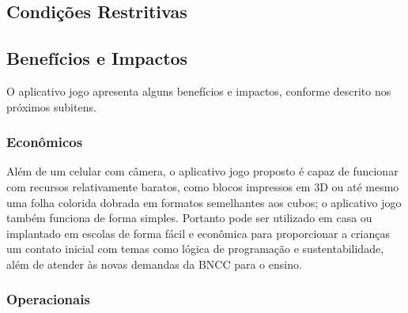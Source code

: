      \subsection{Condições Restritivas}
    
        
        
        
        
    
 \subsection{Benefícios e Impactos}
O aplicativo jogo apresenta alguns benefícios e impactos, conforme descrito nos próximos subitens.

        \subsubsection{Econômicos}
Além de um celular com câmera, o aplicativo jogo proposto é capaz de funcionar com recursos relativamente baratos, como blocos impressos em 3D ou até mesmo uma folha colorida dobrada em formatos semelhantes aos cubos; o aplicativo jogo também funciona de forma simples. Portanto pode ser utilizado em casa ou implantado em escolas de forma fácil e econômica para proporcionar a crianças um contato inicial com temas como lógica de programação e sustentabilidade, além de atender às novas demandas da BNCC para o ensino.
        
        \subsubsection{Operacionais}
        
